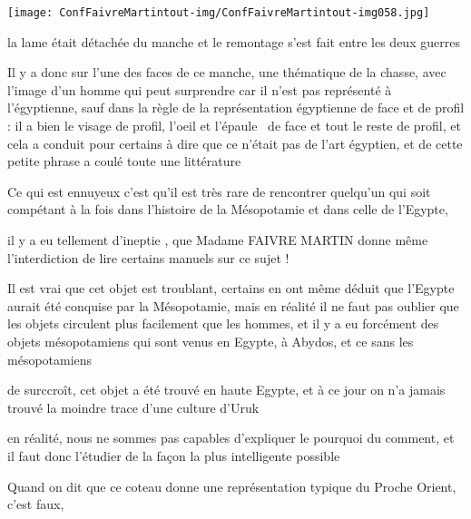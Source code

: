 \documentclass[a4paper]{article}
\begin{document}
\bigskip


\texttt{[image: ConfFaivreMartintout-img/ConfFaivreMartintout-img058.jpg]}



\bigskip


\bigskip


\bigskip


\bigskip

{
la lame était détachée du manche et le remontage s'est fait entre les
deux guerres}


\bigskip

{
Il y a donc sur l'une des faces de ce manche, une thématique de la
chasse, avec l'image d'un homme qui peut surprendre car il n'est pas
représenté à l'égyptienne, sauf dans la règle de la représentation
égyptienne de face et de profil : il a bien le visage de profil, l'oeil
et l'épaule \ de face et tout le reste de profil, et cela a conduit
pour certains à dire que ce n'était pas de l'art égyptien, et de cette
petite phrase a coulé toute une littérature}


\bigskip


\bigskip

{
Ce qui est ennuyeux c'est qu'il est très rare de rencontrer quelqu'un
qui soit compétant à la fois dans l'histoire de la Mésopotamie et dans
celle de l'Egypte, }

{
il y a eu tellement d'ineptie , que Madame FAIVRE MARTIN donne même
l'interdiction de lire certains manuels sur ce sujet !}


\bigskip

{
Il est vrai que cet objet est troublant, certains en ont même déduit que
l'Egypte aurait été conquise par la Mésopotamie, mais en réalité il ne
faut pas oublier que les objets circulent plus facilement que les
hommes, et il y a eu forcément des objets mésopotamiens qui sont venus
en Egypte, à Abydos, et ce sans les mésopotamiens}

{
de surccroît, cet objet a été trouvé en haute Egypte, et à ce jour on
n'a jamais trouvé la moindre trace d'une culture d'Uruk}


\bigskip

{
en réalité, nous ne sommes pas capables d'expliquer le pourquoi du
comment, et il faut donc l'étudier de la façon la plus intelligente
possible}

{
Quand on dit que ce coteau donne une représentation typique du Proche
Orient, c'est faux, }
\end{document}
